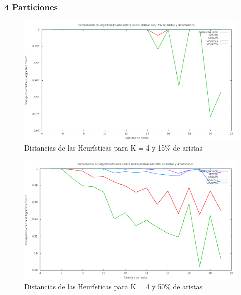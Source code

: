 \subsubsection{4 Particiones}

\begin{figure}[H]
\begin{center}
\includegraphics[scale=0.3]{finales/ComparacionesCon4Particiones15Aristas.png}
\caption{Distancias de las Heur\'isticas para K = 4 y 15\% de aristas}
\end{center}
\end{figure}

\begin{figure}[H]
\begin{center}
\includegraphics[scale=0.3]{finales/ComparacionesCon4Particiones50Aristas.png}
\caption{Distancias de las Heur\'isticas para K = 4 y 50\% de aristas}
\end{center}
\end{figure}

